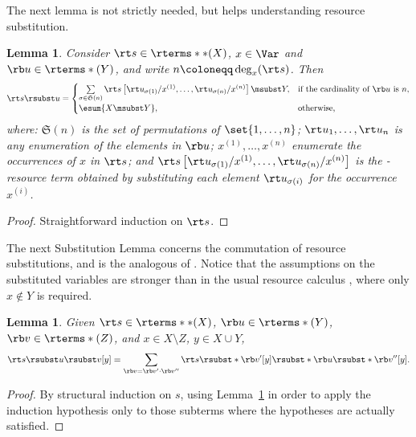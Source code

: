 \documentclass[10pt,a4paper]{amsart}
\newtheorem{lemma}[theorem]{Lemma}
\theoremstyle{definition}
\begin{document}
The next lemma is not strictly needed, but helps understanding resource substitution.

\begin{lemma}\label{lem:aboutressubst}
	Consider $\rt s \in \rterms**(X)$, $x \in \Var$ and
	$\rb u \in \rterms*(Y)$,
	and write $n \coloneqq \deg_x(\rt s)$. Then
	\[	\rt s \rsubst u = 
		\begin{cases}
		\sum\limits_{\sigma \in \mathfrak{S}(n)}
			\rt s\left[ \rt u_{\sigma(1)}/x^{(1)}, \dots, 
			\rt u_{\sigma(n)}/x^{(n)} \right] \msubst Y,
			& \text{if the cardinality of $\rb u$ is $n$,} \\
		\esum {X \msubst Y}, & \text{otherwise,}\\
		\end{cases} 
	\]
	where: $\mathfrak{S}(n)$ is the set of permutations of $\set{1,\dots,n}$;
	$\rt u_1,\dots,\rt u_n$ is any enumeration of the elements in $\rb u$;
	$x^{(1)},\dots,x^{(n)}$ enumerate the occurrences of $x$ in $\rt s$; and
	$\rt s\left[ \rt u_{\sigma(1)}/x^{(1)}, \dots, \rt u_{\sigma(n)}/x^{(n)} \right]$
	is the \lamI-resource term obtained by substituting each element $\rt u_{\sigma(i)}$ for the occurrence $x^{(i)}$.
\end{lemma}
	
	\begin{proof}
	Straightforward induction on $\rt s$.
	\end{proof}

The next Substitution Lemma concerns the commutation of resource substitutions, and is the analogous of \cite[Lemma~2.1.16]{Bare}.
Notice that the assumptions on the substituted variables
are stronger than in the usual resource calculus
\cite[Lemma~2]{Ehrhard.Reg.08},
where only $x \notin Y$ is required.

\setcounter{lem:resource-substitution}{\thetheorem}
\begin{lemma}
\label{lem:resource-substitution}
	Given $\rt s \in \rterms**(X)$,
	$\rb u \in \rterms*(Y)$,
	$\rb v \in \rterms*(Z)$,
	and
	$x \in X \setminus Z$, $y \in X \cup Y$,
	\[	\rt s \rsubst u \rsubst v [y] =
		\sum_{\rb v = \rb v' \cdot \rb v''} \rt s \rsubst* {\rb v'} [y]
		\rsubst*{ \rb u \rsubst* {\rb v''}[y] }. \]
\end{lemma}
\begin{proof} By structural induction on $s$, using Lemma~\ref{lem:aboutressubst} in order to apply the induction hypothesis only to those subterms where the hypotheses are actually satisfied.
\end{proof}
\end{document}
